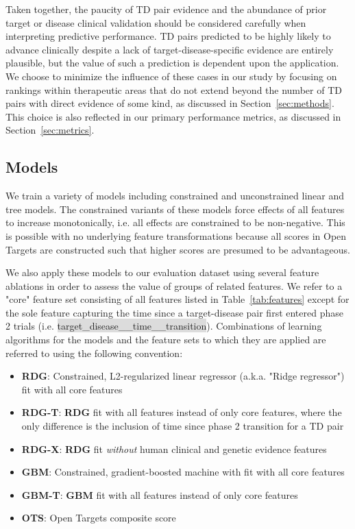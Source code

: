\documentclass{article}
\begin{document}
Taken together, the paucity of TD pair evidence and the abundance of prior target or disease clinical validation should be considered carefully when interpreting predictive performance. TD pairs predicted to be highly likely to advance clinically despite a lack of target-disease-specific evidence are entirely plausible, but the value of such a prediction is dependent upon the application. We choose to minimize the influence of these cases in our study by focusing on rankings within therapeutic areas that do not extend beyond the number of TD pairs with direct evidence of some kind, as discussed in Section~\ref{sec:methods}. This choice is also reflected in our primary performance metrics, as discussed in Section~\ref{sec:metrics}.

\subsection{Models}
\label{sec:models}

We train a variety of models including constrained and unconstrained linear and tree models. The constrained variants of these models force effects of all features to increase monotonically, i.e. all effects are constrained to be non-negative. This is possible with no underlying feature transformations because all scores in Open Targets are constructed such that higher scores are presumed to be advantageous. 

We also apply these models to our evaluation dataset using several feature ablations in order to assess the value of groups of related features. We refer to a "core" feature set consisting of all features listed in Table~\ref{tab:features} except for the sole feature capturing the time since a target-disease pair first entered phase 2 trials (i.e. \colorbox{Gainsboro}{target\_disease\_\_time\_\_transition}). Combinations of learning algorithms for the models and the feature sets to which they are applied are referred to using the following convention:

\begin{itemize}
  \item \textbf{RDG}: Constrained, L2-regularized linear regressor (a.k.a. "Ridge regressor") fit with all core features
  \item \textbf{RDG-T}: \textbf{RDG} fit with all features instead of only core features, where the only difference is the inclusion of time since phase 2 transition for a TD pair
  \item \textbf{RDG-X}: \textbf{RDG} fit \textit{without} human clinical and genetic evidence features
  \item \textbf{GBM}: Constrained, gradient-boosted machine with fit with all core features
  \item \textbf{GBM-T}: \textbf{GBM} fit with all features instead of only core features
  \item \textbf{OTS}: Open Targets composite score
\end{itemize}
\end{document}
